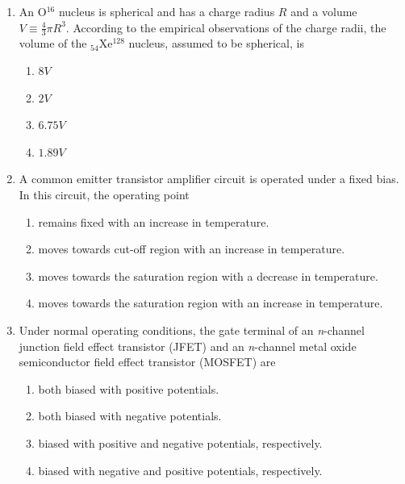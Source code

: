 \documentclass[journal,12pt,onecolumn]{IEEEtran}
\theoremstyle{remark}
\begin{document}
\begin{enumerate}
\hfill{}
\begin{multicols}{4}
    \begin{enumerate}
        \item u u d
        \item u $\bar{c}$
        \item u $\bar{s}$
        \item s $\bar{u}$
    \end{enumerate}
\end{multicols}

\item An O$^{16}$ nucleus is spherical and has a charge radius $R$ and a volume $V \equiv \frac{4}{3} \pi R^3$.  
According to the empirical observations of the charge radii, the volume of the $_{54}$Xe$^{128}$ nucleus, assumed to be spherical, is

\hfill{}
\begin{multicols}{4}
    \begin{enumerate}
        \item $8V$
        \item $2V$
        \item $6.75V$
        \item $1.89V$
    \end{enumerate}
\end{multicols}
\item A common emitter transistor amplifier circuit is operated under a fixed bias. In this circuit, the operating point

\hfill{}
    \begin{enumerate}
        \item remains fixed with an increase in temperature.
        \item moves towards cut-off region with an increase in temperature.
        \item moves towards the saturation region with a decrease in temperature.
        \item moves towards the saturation region with an increase in temperature.
    \end{enumerate}


\item Under normal operating conditions, the gate terminal of an \textit{n}-channel junction field effect transistor (JFET) and an \textit{n}-channel metal oxide semiconductor field effect transistor (MOSFET) are

\hfill{}
    \begin{enumerate}
        \item both biased with positive potentials.
        \item both biased with negative potentials.
        \item biased with positive and negative potentials, respectively.
        \item biased with negative and positive potentials, respectively.
    \end{enumerate}


\end{enumerate}
\end{document}
